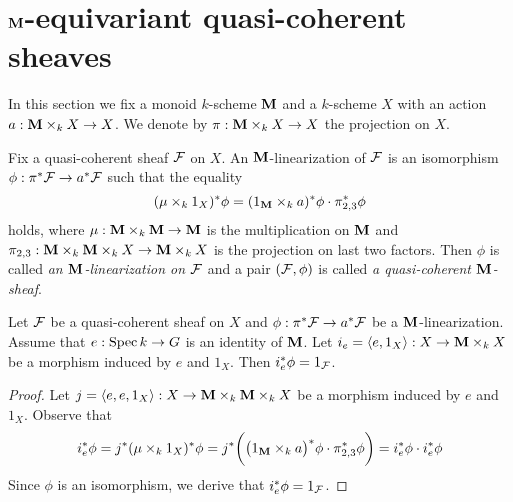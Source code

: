 \section{$\mathbf{M}$-equivariant quasi-coherent sheaves}
\noindent
In this section we fix a monoid $k$-scheme $\mathbf{M}$ and a $k$-scheme $X$ with an action $a:\mathbf{M} \times_k X \rightarrow X$. We denote by $\pi: \mathbf{M}\times_kX\rightarrow X$ the projection on $X$.

\begin{definition}
Fix a quasi-coherent sheaf ${\mathcal F}$ on $X$. An $\mathbf{M}$-linearization of ${\mathcal F}$ is an isomorphism $\phi:\pi^*{\mathcal F} \rightarrow a^* {\mathcal F}$ such that the equality
$$(\mu\times_k1_X)^*\phi = (1_{\mathbf{M}} \times_k a)^*\phi \cdot \pi_{2,3}^*\phi$$
holds, where $\mu: \mathbf{M} \times_k \mathbf{M} \rightarrow \mathbf{M}$ is the multiplication on $\mathbf{M}$ and $\pi_{2,3}:\mathbf{M}\times_k \mathbf{M} \times_k X \rightarrow \mathbf{M} \times_kX$ is the projection on last two factors. Then $\phi$ is called \textit{an $\mathbf{M}$-linearization on ${\mathcal F}$} and a pair $({\mathcal F},\phi)$ is called \textit{a quasi-coherent $\mathbf{M}$-sheaf}.
\end{definition}

\begin{proposition}\label{proposition:compatibility_with_identity}
Let ${\mathcal F}$ be a quasi-coherent sheaf on $X$ and $\phi:\pi^*{\mathcal F}\rightarrow a^*{\mathcal F}$ be a $\mathbf{M}$-linearization. Assume that $e:\mathrm{Spec}\, k\rightarrow G$ is an identity of $\mathbf{M}$. Let $i_e = \langle e, 1_X\rangle :X\rightarrow \mathbf{M} \times_kX$ be a morphism induced by $e$ and $1_X$. Then $i^*_e\phi = 1_{{\mathcal F}}$.
\end{proposition}
\begin{proof}
Let $j = \langle e, e, 1_X\rangle:X \rightarrow \mathbf{M} \times_k \mathbf{M} \times_kX$ be a morphism induced by $e$ and $1_X$. Observe that
$$i_e^*\phi=j^*(\mu\times_k1_X)^*\phi = j^* \bigg(\big(1_{\mathbf{M}} \times_k a\big)^*\phi \cdot \pi^*_{2,3}\phi\bigg)=i^*_e\phi \cdot i^*_e\phi$$
Since $\phi$ is an isomorphism, we derive that $i_e^*\phi=1_{{\mathcal F}}$.
\end{proof}

